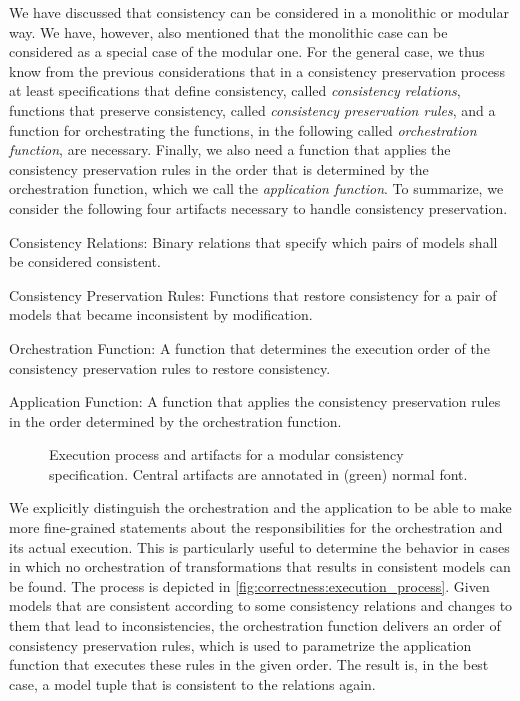 We have discussed that consistency can be considered in a monolithic or modular way. We have, however, also mentioned that the monolithic case can be considered as a special case of the modular one.
For the general case, we thus know from the previous considerations that in a consistency preservation process at least specifications that define consistency, called \emph{consistency relations}, functions that preserve consistency, called \emph{consistency preservation rules}, and a function for orchestrating the functions, in the following called \emph{orchestration function}, are necessary. Finally, we also need a function that applies the consistency preservation rules in the order that is determined by the orchestration function, which we call the \emph{application function}.
To summarize, we consider the following four artifacts necessary to handle consistency preservation.
\begin{properdescription}
    \item[Consistency Relations:] Binary relations that specify which pairs of models shall be considered consistent.
    \item[Consistency Preservation Rules:] Functions that restore consistency for a pair of models that became inconsistent by modification.
    \item[Orchestration Function:] A function that determines the execution order of the consistency preservation rules to restore consistency.
    \item[Application Function:] A function that applies the consistency preservation rules in the order determined by the orchestration function. 
\end{properdescription}

\begin{figure}
    \centering
    
    \caption[Consistency specification execution process and artifacts]{Execution process and artifacts for a modular consistency specification. Central artifacts are annotated in (green) normal font.}
    \label{fig:correctness:execution_process}
\end{figure}

We explicitly distinguish the orchestration and the application to be able to make more fine-grained statements about the responsibilities for the orchestration and its actual execution.
This is particularly useful to determine the behavior in cases in which no orchestration of transformations that results in consistent models can be found.
The process is depicted in \autoref{fig:correctness:execution_process}. Given models that are consistent according to some consistency relations and changes to them that lead to inconsistencies, the orchestration function delivers an order of consistency preservation rules, which is used to parametrize the application function that executes these rules in the given order.
The result is, in the best case, a model tuple that is consistent to the relations again.
